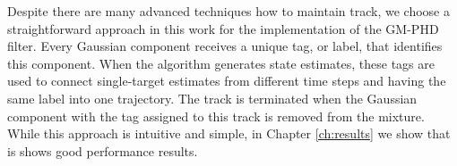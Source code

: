Despite there are many advanced techniques how to maintain track, we choose a straightforward approach in this work for the implementation of the GM-PHD filter. Every Gaussian component receives a unique tag, or label, that identifies this component. When the algorithm generates state estimates, these tags are used to connect single-target estimates from different time steps and having the same label into one trajectory. The track is terminated when the Gaussian component with the tag assigned to this track is removed from the mixture. While this approach is intuitive and simple, in Chapter \ref{ch:results} we show that is shows good performance results.
